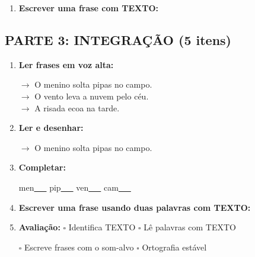 \begin{exercicio}
\begin{enumerate}[resume]
  \item \textbf{Escrever uma frase com TEXTO:}
  \begin{center}
  \underline{\hspace{12cm}}
  \end{center}

\end{enumerate}

\subsection*{PARTE 3: INTEGRAÇÃO (5 itens)}

\begin{enumerate}[resume]

  \item \textbf{Ler frases em voz alta:}
  \begin{center}
  $\rightarrow$ O menino solta pipas no campo.\\
  $\rightarrow$ O vento leva a nuvem pelo céu.\\
  $\rightarrow$ A risada ecoa na tarde.\\
  \end{center}

  \item \textbf{Ler e desenhar:}
  \begin{center}
  $\rightarrow$ O menino solta pipas no campo.
  \end{center}
  \begin{center}
  \end{center}

  \item \textbf{Completar:}
  \begin{center}
  men\underline{~~~} \quad pip\underline{~~~} \quad ven\underline{~~~} \quad cam\underline{~~~}
  \end{center}

  \item \textbf{Escrever uma frase usando duas palavras com TEXTO:}
  \begin{center}
  \underline{\hspace{12cm}}
  \end{center}

  \item \textbf{Avaliação:} $\square$ Identifica TEXTO \quad $\square$ Lê palavras com TEXTO
  \begin{center}
  $\square$ Escreve frases com o som-alvo \quad $\square$ Ortografia estável
  \end{center}


\end{enumerate}
\end{exercicio}
